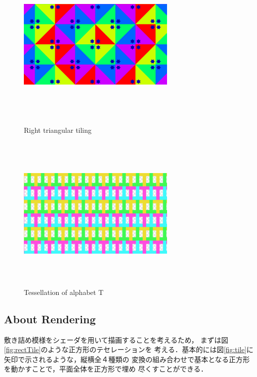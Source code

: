 \begin{figure}[h!tbp]
 \begin{minipage}{0.49\hsize}
  \center
  \includegraphics[width=3in, height=3in, keepaspectratio]{../img/tessellation/rightTriangular.pdf}
  \caption{Right triangular tiling}
  \label{fig:rightTriangular}
 \end{minipage}
 \begin{minipage}{0.49\hsize}
  \center
  \includegraphics[width=3in, height=3in, keepaspectratio]{../img/tessellation/tessellationT.pdf}
  \caption{Tessellation of alphabet T}
  \label{fig:tessellationT}
 \end{minipage}
\end{figure}

\subsection{About Rendering}

敷き詰め模様をシェーダを用いて描画することを考えるため，
まずは図\ref{fig:rectTile}のような正方形のテセレーションを
考える．基本的には図\ref{fig:tile}に矢印で示されるような，縦横全４種類の
変換の組み合わせで基本となる正方形を動かすことで，平面全体を正方形で埋め
尽くすことができる．

